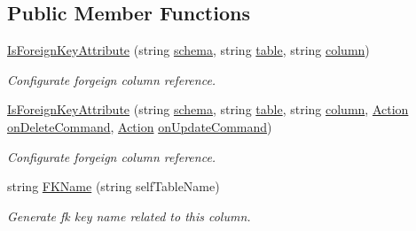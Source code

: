\subsection*{Public Member Functions}
\begin{DoxyCompactItemize}
\item 
\mbox{\hyperlink{class_uniform_data_operator_1_1_sql_1_1_markup_1_1_is_foreign_key_attribute_a3e87ebbd7ead7b4e0c359c7340bcc2cb}{Is\+Foreign\+Key\+Attribute}} (string \mbox{\hyperlink{class_uniform_data_operator_1_1_sql_1_1_markup_1_1_is_foreign_key_attribute_a0ccdb7ac6c441bbba664d370aec645d1}{schema}}, string \mbox{\hyperlink{class_uniform_data_operator_1_1_sql_1_1_markup_1_1_is_foreign_key_attribute_ae210d1001824383251ca3ba1a0f3fd20}{table}}, string \mbox{\hyperlink{class_uniform_data_operator_1_1_sql_1_1_markup_1_1_is_foreign_key_attribute_aa305b69f1eac8e7335b9776b5d30625e}{column}})
\begin{DoxyCompactList}\small\item\em Configurate forgeign column reference. \end{DoxyCompactList}\item 
\mbox{\hyperlink{class_uniform_data_operator_1_1_sql_1_1_markup_1_1_is_foreign_key_attribute_a9e2d1563091c53e8e1c9c66e53eea23e}{Is\+Foreign\+Key\+Attribute}} (string \mbox{\hyperlink{class_uniform_data_operator_1_1_sql_1_1_markup_1_1_is_foreign_key_attribute_a0ccdb7ac6c441bbba664d370aec645d1}{schema}}, string \mbox{\hyperlink{class_uniform_data_operator_1_1_sql_1_1_markup_1_1_is_foreign_key_attribute_ae210d1001824383251ca3ba1a0f3fd20}{table}}, string \mbox{\hyperlink{class_uniform_data_operator_1_1_sql_1_1_markup_1_1_is_foreign_key_attribute_aa305b69f1eac8e7335b9776b5d30625e}{column}}, \mbox{\hyperlink{class_uniform_data_operator_1_1_sql_1_1_markup_1_1_is_foreign_key_attribute_ae6c77deaf80d5c4d07709edf51eaebc5}{Action}} \mbox{\hyperlink{class_uniform_data_operator_1_1_sql_1_1_markup_1_1_is_foreign_key_attribute_a5055e5326f37afb695398139353139b2}{on\+Delete\+Command}}, \mbox{\hyperlink{class_uniform_data_operator_1_1_sql_1_1_markup_1_1_is_foreign_key_attribute_ae6c77deaf80d5c4d07709edf51eaebc5}{Action}} \mbox{\hyperlink{class_uniform_data_operator_1_1_sql_1_1_markup_1_1_is_foreign_key_attribute_a262baa0ebcc9ee448750f96019f0e14c}{on\+Update\+Command}})
\begin{DoxyCompactList}\small\item\em Configurate forgeign column reference. \end{DoxyCompactList}\item 
string \mbox{\hyperlink{class_uniform_data_operator_1_1_sql_1_1_markup_1_1_is_foreign_key_attribute_a5812ac056c373e4514466df8336ad808}{F\+K\+Name}} (string self\+Table\+Name)
\begin{DoxyCompactList}\small\item\em Generate fk key name related to this column. \end{DoxyCompactList}\end{DoxyCompactItemize}
